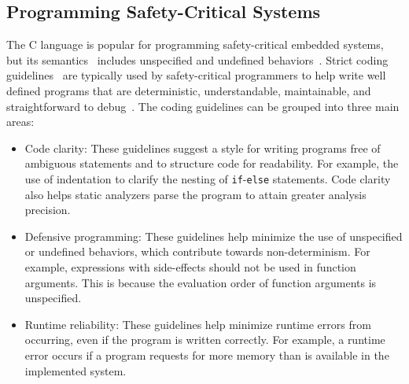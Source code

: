 \subsection{Programming Safety-Critical Systems}
\label{sec:forecLanguage_programming}
The C language is popular for programming safety-critical embedded systems, 
but its semantics~\cite{programming_languages_c} includes unspecified 
and undefined behaviors~\cite{programming_languages_c_pitfalls}. Strict 
coding guidelines~\cite{safety_critical_coding_misrac_standard,safety_critical_coding_power_10,safety_critical_coding_jpl} 
are typically used by safety-critical programmers to help write well 
defined programs that are deterministic, understandable, maintainable, 
and straightforward to debug~\cite{wcet_software_structure,safety_critical_coding_misrac_overview}. 
The coding guidelines can be grouped into three main areas: 
\begin{itemize}
	\item Code clarity: These guidelines suggest a style for writing programs
		  free of ambiguous statements and to structure code for readability. 
		  For example, the use of indentation to clarify the nesting of 
		  \verb$if$-\verb$else$ statements.
		  Code clarity also helps static analyzers parse the program to 
		  attain greater analysis precision.
	\item Defensive programming: These guidelines help minimize the use of 
		  unspecified or undefined behaviors, which contribute towards
		  non-determinism. For example, expressions with side-effects should
		  not be used in function arguments. This is because the evaluation order of 
		  function arguments is unspecified.
	\item Runtime reliability: These guidelines help minimize runtime errors 
		  from occurring, even if the program is written correctly. 
		  For example, a runtime error occurs if a program requests for 
		  more memory than is available in the implemented system. 
\end{itemize}

